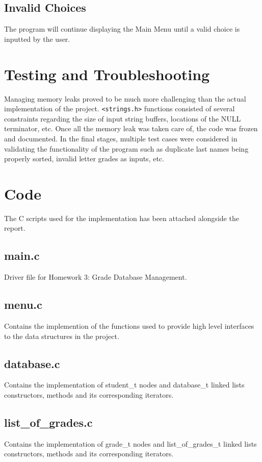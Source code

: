 \documentclass[usletter, 12pt]{article}
\begin{document}
        \subsection{Invalid Choices} The program will continue displaying the
        Main Menu until a valid choice is inputted by the user.

    \section{Testing and Troubleshooting} Managing memory leaks proved to be
    much more challenging than the actual implementation of the project.
    \texttt{<strings.h>} functions consisted of several constraints regarding
    the size of input string buffers, locations of the NULL terminator, etc.
    Once all the memory leak was taken care of, the code was frozen and
    documented. In the final stages, multiple test cases were considered in
    validating the functionality of the program such as duplicate last names
    being properly sorted, invalid letter grades as inputs, etc.

    \section{Code}
    The C scripts used for the implementation has been attached alongside the report.

        \subsection{main.c} Driver file for Homework 3: Grade Database
        Management.

        \subsection{menu.c} Contains the implemention of the functions used to
        provide high level interfaces to the data structures in the project.

        \subsection{database.c} Contains the implementation of student\_t nodes
        and database\_t linked lists constructors, methods and its
        corresponding iterators.

        \subsection{list\_of\_grades.c} Contains the implementation of grade\_t
        nodes and list\_of\_grades\_t linked lists constructors, methods and
        its corresponding iterators.
\end{document}
